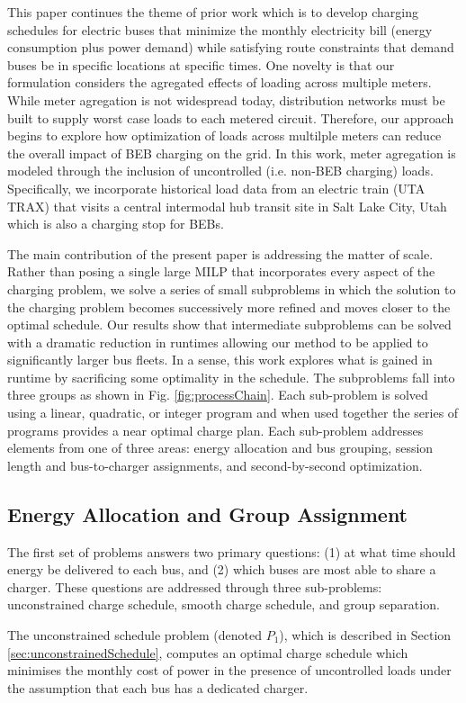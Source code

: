 \par This paper continues the theme of prior work which is to develop charging schedules for electric buses that minimize the monthly electricity bill (energy consumption plus power demand) while satisfying route constraints that demand buses be in specific locations at specific times.  One novelty is that our formulation considers the agregated effects of loading across multiple meters.  While meter agregation is not widespread today, distribution networks must be built to supply worst case loads to each metered circuit.  Therefore, our approach begins to explore how optimization of loads across multilple meters can reduce the overall impact of BEB charging on the grid.  In this work, meter agregation is modeled through the inclusion of uncontrolled (i.e. non-BEB charging) loads.  Specifically, we incorporate historical load data from an electric train (UTA TRAX) that visits a central intermodal hub transit site in Salt Lake City, Utah which is also a charging stop for BEBs.

\par The main contribution of the present paper is addressing the matter of scale.  Rather than posing a single large MILP that incorporates every aspect of the charging problem, we solve a series of small subproblems in which the solution to the charging problem becomes successively more refined and moves closer to the optimal schedule.  Our results show that intermediate subproblems can be solved with a dramatic reduction in runtimes allowing our method to be applied to significantly larger bus fleets.  In a sense, this work explores what is gained in runtime by sacrificing some optimality in the schedule.  The subproblems fall into three groups as shown in Fig. \ref{fig:processChain}.  Each sub-problem is solved using a linear, quadratic, or integer program and when used together the series of programs provides a near optimal charge plan. Each sub-problem addresses elements from one of three areas: energy allocation and bus grouping, session length and bus-to-charger assignments, and second-by-second optimization.  

\subsection{Energy Allocation and Group Assignment}

\par The first set of problems answers two primary questions: (1) at what time should energy be delivered to each bus, and (2) which buses are most able to share a charger. These questions are addressed through three sub-problems: unconstrained charge schedule, smooth charge schedule, and group separation.  
\par The unconstrained schedule problem (denoted $P_1$), which is described in Section \ref{sec:unconstrainedSchedule}, computes an optimal charge schedule which minimises the monthly cost of power in the presence of uncontrolled loads under the assumption that each bus has a dedicated charger.

